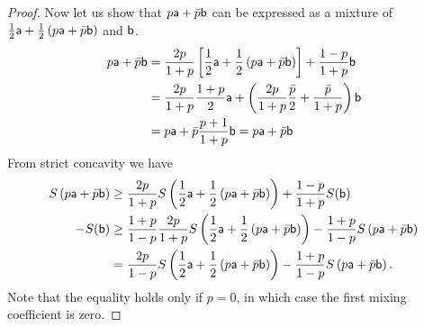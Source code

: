 \begin{mathSection}
\begin{proof}
	Now let us show that $p \ens[a] + \bar{p} \ens[b]$ can be expressed as a mixture of $\frac{1}{2} \ens[a] + \frac{1}{2}\left(p\ens[a] + \bar{p} \ens[b]\right)$ and $\ens[b]$.
	\begin{equation}
		\begin{aligned}
			p \ens[a] + \bar{p} \ens[b] &= \frac{2p}{1+p}\left[\frac{1}{2} \ens[a] + \frac{1}{2}\left(p\ens[a] + \bar{p} \ens[b]\right)\right] + \frac{1-p}{1+p} \ens[b] \\
			&= \frac{2p}{1+p} \frac{1+p}{2} \ens[a] + \left( \frac{2p}{1+p} \frac{\bar{p}}{2}+ \frac{\bar{p}}{1+p} \right) \ens[b] \\
			&= p \ens[a] + \bar{p} \frac{p+1}{1+p}\ens[b] = p \ens[a] +\bar{p} \ens[b]
		\end{aligned}
	\end{equation}
	From strict concavity we have
	\begin{equation}
		\begin{aligned}
			S\left(p \ens[a] + \bar{p} \ens[b] \right)&\geq \frac{2p}{1+p} S\left(\frac{1}{2} \ens[a] + \frac{1}{2}\left(p\ens[a] + \bar{p} \ens[b]\right)\right) + \frac{1-p}{1+p} S(\ens[b]) \\
			-S(\ens[b]) &\geq \frac{1+p}{1-p} \frac{2p}{1+p} S\left(\frac{1}{2} \ens[a] + \frac{1}{2}\left(p\ens[a] + \bar{p} \ens[b]\right)\right) - \frac{1+p}{1-p} S\left(p \ens[a] + \bar{p} \ens[b] \right) \\
			&= \frac{2p}{1-p} S\left(\frac{1}{2} \ens[a] + \frac{1}{2}\left(p\ens[a] + \bar{p} \ens[b]\right)\right) - \frac{1+p}{1-p} S\left(p \ens[a] + \bar{p} \ens[b] \right).
		\end{aligned}
	\end{equation}
	Note that the equality holds only if $p=0$, in which case the first mixing coefficient is zero.
	

\end{proof}
\end{mathSection}
